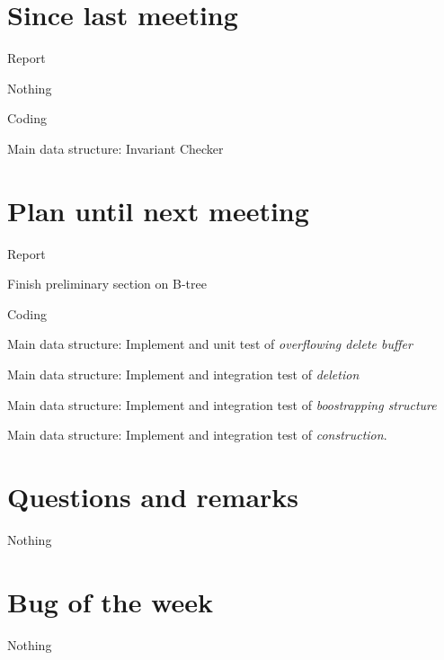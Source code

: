 \documentclass[a4paper,11pt,agenda,chair]{meetingmins}
\begin{document}
\maketitle

\section{Since last meeting}
\begin{items}
\item Report
	\begin{items}
		\item Nothing
	\end{items}
\item Coding
	\begin{items}
		\item Main data structure: Invariant Checker
	\end{items}
\end{items}

\section{Plan until next meeting}
\begin{items}
\item Report
	\begin{items}
		\item Finish preliminary section on B-tree
	\end{items}
\item Coding
	\begin{items}
		\item Main data structure: Implement and unit test of \textit{overflowing delete buffer}
		\item Main data structure: Implement and integration test of \textit{deletion}
		\item Main data structure: Implement and integration test of \textit{boostrapping structure}
		\item Main data structure: Implement and integration test of \textit{construction}.
	\end{items}
\end{items}

\section{Questions and remarks}
\begin{items}
	\item Nothing
\end{items}



\section{Bug of the week}
Nothing
\end{document}
